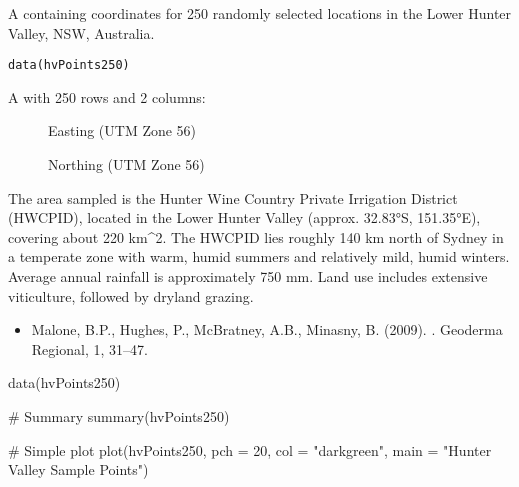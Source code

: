 \documentclass[a4paper]{book}
\begin{document}
%
\begin{Description}
A  containing coordinates for 250 randomly selected locations in the Lower Hunter Valley, NSW, Australia.
\end{Description}
%
\begin{Usage}
\begin{verbatim}
data(hvPoints250)
\end{verbatim}
\end{Usage}
%
\begin{Format}
A  with 250 rows and 2 columns:
\begin{description}

\item[] Easting (UTM Zone 56)
\item[] Northing (UTM Zone 56)

\end{description}

\end{Format}
%
\begin{Details}
The area sampled is the Hunter Wine Country Private Irrigation District (HWCPID), located in the Lower Hunter Valley (approx. 32.83°S, 151.35°E), covering about 220 km\textasciicircum{}2. The HWCPID lies roughly 140 km north of Sydney in a temperate zone with warm, humid summers and relatively mild, humid winters. Average annual rainfall is approximately 750 mm. Land use includes extensive viticulture, followed by dryland grazing.
\end{Details}
%
\begin{References}
\begin{itemize}

\item{} Malone, B.P., Hughes, P., McBratney, A.B., Minasny, B. (2009). . Geoderma Regional, 1, 31–47.

\end{itemize}

\end{References}
%
\begin{Examples}
\begin{ExampleCode}
data(hvPoints250)

# Summary
summary(hvPoints250)

# Simple plot
plot(hvPoints250, pch = 20, col = "darkgreen", main = "Hunter Valley Sample Points")
\end{ExampleCode}
\end{Examples}
\end{document}

